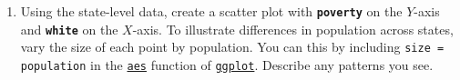 \documentclass[11pt]{article}
\begin{document}
\begin{onehalfspacing}
\begin{enumerate}
\item Using the state-level data, create a scatter plot with \textbf{\texttt{poverty}} on the $Y$-axis and \textbf{\texttt{white}} on the $X$-axis. To illustrate differences in population across states, vary the size of each point by population. You can this by including \texttt{size = population} in the \href{https://ggplot2.tidyverse.org/reference/aes.html}{\texttt{aes}} function of \href{https://ggplot2.tidyverse.org/reference/ggplot.html}{\texttt{ggplot}}. Describe any patterns you see.


\end{enumerate}
\end{onehalfspacing}
\end{document}

